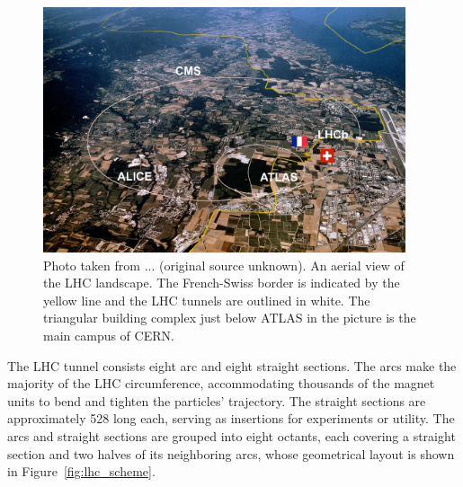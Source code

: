 \begin{figure}[!htb]
    \centering
    \captionsetup{justification=justified}
    \includegraphics[width=0.95\textwidth]{pics/LHC_CMS/LHC_landscape.png}
    \caption{Photo taken from ... (original source unknown). 
             An aerial view of the LHC landscape. The French-Swiss border is indicated by the yellow line and the LHC tunnels are outlined in white.
             The triangular building complex just below ATLAS in the picture is the main campus of CERN.}
    \label{fig:lhc_landscape}
\end{figure}

The LHC tunnel consists eight arc and eight straight sections.
The arcs make the majority of the LHC circumference, accommodating thousands of the magnet units to bend and tighten the particles' trajectory.
The straight sections are approximately 528 \meter long each, serving as insertions for experiments or utility. 
The arcs and straight sections are grouped into eight octants, each covering a straight section and two halves of its neighboring arcs,
whose geometrical layout is shown in Figure~\ref{fig:lhc_scheme}. 

